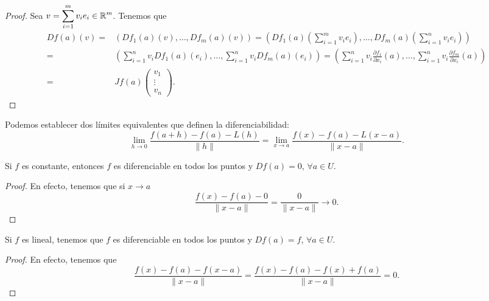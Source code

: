 \begin{proof}
Sea $\displaystyle v = \sum^{m}_{i = 1}v_{i}e_{i}\in \mathbb{R}^{m} $. Tenemos que 
\[
\begin{split}
	Df\left(a\right)\left(v\right) = & \left(Df_{1}\left(a\right)\left(v\right), \ldots, Df_{m}\left(a\right)\left(v\right)\right) 
	=  \left(Df_{1}\left(a\right)\left(\sum^{m}_{i = 1}v_{i}e_{i}\right), \ldots, Df_{m}\left(a\right)\left(\sum^{n}_{i = 1}v_{i}e_{i}\right)\right) \\
	= & \left(\sum^{n}_{i = 1}v_{i}Df_{1}\left(a\right)\left(e_{i}\right), \ldots, \sum^{n}_{i = 1}v_{i}Df_{m}\left(a\right)\left(e_{i}\right)\right) 
	=  \left(\sum^{n}_{i = 1}v_{i}\frac{\partial f_{1}}{\partial x_{i}}\left(a\right), \ldots, \sum^{n}_{ i= 1}v_{i}\frac{\partial f_{m}}{\partial x_{i}}\left(a\right)\right) \\
	= & Jf\left(a\right) \begin{pmatrix} v_{1} \\ \vdots \\ v_{n} \end{pmatrix}.
\end{split}
\]
\end{proof}
\begin{observation}
Podemos establecer dos límites equivalentes que definen la diferenciabilidad:
\[\lim_{h \to 0}\frac{f\left(a + h\right)-f\left(a\right)-L\left(h\right)}{\|h\|} = \lim_{x \to a}\frac{f\left(x\right)-f\left(a\right)-L\left(x-a\right)}{\|x-a\|} .\]
\end{observation}
\begin{prop}
Si $\displaystyle f $ es constante, entonces $\displaystyle f $ es diferenciable en todos los puntos y $\displaystyle Df\left(a\right) = 0 $, $\displaystyle \forall a \in U $.
\end{prop}
\begin{proof}
En efecto, tenemos que si $\displaystyle x \to a $ 
\[\frac{f\left(x\right)-f\left(a\right)-0}{\|x-a\|} = \frac{0}{ \| x- a\|} \to 0 .\]
\end{proof}
\begin{prop}
Si $\displaystyle f $ es lineal, tenemos que $\displaystyle f $ es diferenciable en todos los puntos y $\displaystyle Df\left(a\right) = f $, $\displaystyle \forall a \in U $. 
\end{prop}
\begin{proof}
En efecto, tenemos que
\[\frac{f\left(x\right)-f\left(a\right)-f\left(x-a\right)}{ \|x-a\|} = \frac{f\left(x\right)-f\left(a\right)-f\left(x\right)+f\left(a\right)}{\|x-a\|} = 0 .\]	
\end{proof}
